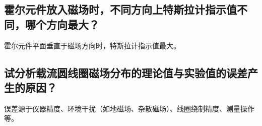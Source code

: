 \documentclass[]{../../templates/Report}%
\begin{document}
\begin{fullreportonly}
\subsection{霍尔元件放入磁场时，不同方向上特斯拉计指示值不同，哪个方向最大？}
霍尔元件平面垂直于磁场方向时，特斯拉计指示值最大。
\subsection{试分析载流圆线圈磁场分布的理论值与实验值的误差产生的原因？}误差源于仪器精度、环境干扰（如地磁场、杂散磁场）、线圈绕制精度、测量操作等。
\end{fullreportonly}
\insertnotes
\end{document}
